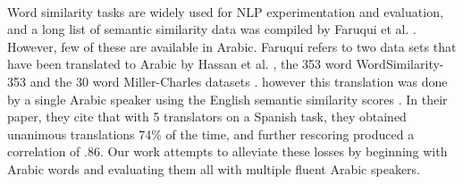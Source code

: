 \\
Word similarity tasks are widely used for NLP experimentation and evaluation, and a long list of semantic similarity data was compiled by Faruqui et al. \cite{faruqui:2014}. However, few of these are available in Arabic. Faruqui refers to two data sets that have been translated to Arabic by Hassan et al. \cite{hassan:2009}, the 353 word WordSimilarity-353 and the 30 word Miller-Charles datasets \cite{finkelstein:2001,miller:1991}. however this translation was done by a single Arabic speaker using the English semantic similarity scores \cite{hassan:2009}. In their paper, they cite that with 5 translators on a Spanish task, they obtained unanimous translations 74\% of the time, and further rescoring produced a correlation of .86. Our work attempts to alleviate these losses by beginning with Arabic words and evaluating them all with multiple fluent Arabic speakers.